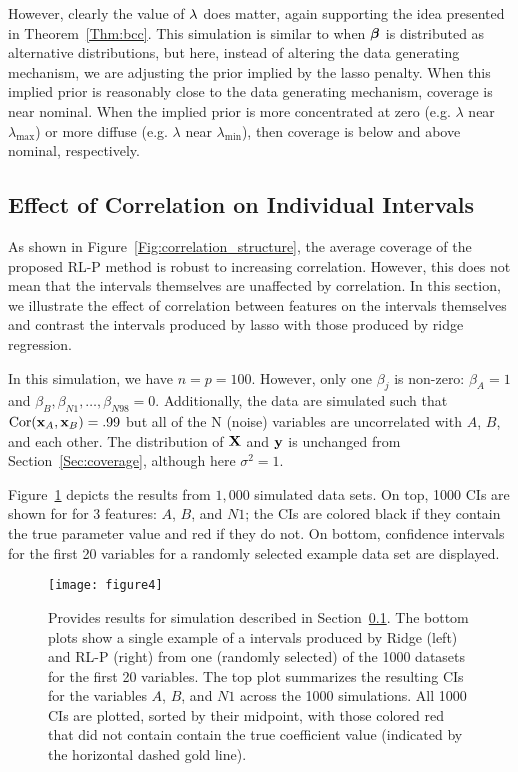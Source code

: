 However, clearly the value of $\lambda$ does matter, again supporting the idea presented in Theorem~\ref{Thm:bcc}. This simulation is similar to when $\boldsymbol{\beta}$ is distributed as alternative distributions, but here, instead of altering the data generating mechanism, we are adjusting the prior implied by the lasso penalty. When this implied prior is reasonably close to the data generating mechanism, coverage is near nominal. When the implied prior is more concentrated at zero (e.g. $\lambda$ near $\lambda_{\max}$) or more diffuse (e.g. $\lambda$ near $\lambda_{\min}$), then coverage is below and above nominal, respectively.

\subsection{Effect of Correlation on Individual Intervals} \label{Sec:Ridge}

As shown in Figure~\ref{Fig:correlation_structure}, the average coverage of the proposed RL-P method is robust to increasing correlation. However, this does not mean that the intervals themselves are unaffected by correlation. In this section, we illustrate the effect of correlation between features on the intervals themselves and contrast the intervals produced by lasso with those produced by ridge regression.

In this simulation, we have $n = p = 100$. However, only one $\beta_j$ is non-zero: $\beta_{A} = 1$ and $\beta_{B}, \beta_{N1}, \ldots, \beta_{N98} = 0$. Additionally, the data are simulated such that $\textrm{Cor}(\mathbf{x}_{A}, \mathbf{x}_{B}) = .99$ but all of the N (noise) variables are uncorrelated with $A$, $B$, and each other. The distribution of $\mathbf{X}$ and $\mathbf{y}$ is unchanged from Section~\ref{Sec:coverage}, although here $\sigma^2 = 1$.

Figure~\ref{Fig:highcorr} depicts the results from $1,000$ simulated data sets. On top, 1000 CIs are shown for for 3 features: $A$, $B$, and $N1$; the CIs are colored black if they contain the true parameter value and red if they do not. On bottom, confidence intervals for the first 20 variables for a randomly selected example data set are displayed.

\begin{figure}[htb!]
  \begin{center}
    \texttt{[image: figure4]}
    \caption{\label{Fig:highcorr}
      Provides results for simulation described in Section~\ref{Sec:Ridge}. The bottom plots show a single example of a intervals produced by Ridge (left) and RL-P (right) from one (randomly selected) of the 1000 datasets for the first 20 variables. The top plot summarizes the resulting CIs for the variables $A$, $B$, and $N1$ across the 1000 simulations. All 1000 CIs are plotted, sorted by their midpoint, with those colored red that did not contain contain the true coefficient value (indicated by the horizontal dashed gold line).
    }
  \end{center}
\end{figure}

